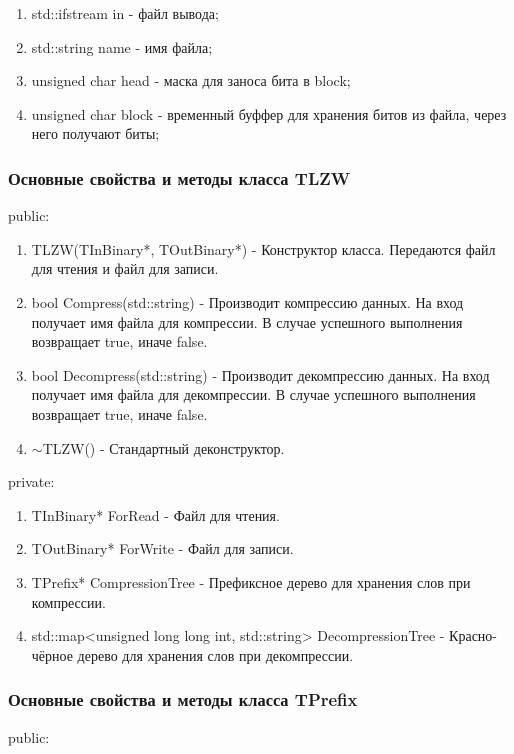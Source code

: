 \documentclass[12pt]{article}
\begin{document}
\begin{enumerate}
	\item std::ifstream in - файл вывода;
    \item std::string name - имя файла;
    \item unsigned char head - маска для заноса бита в block;
    \item unsigned char block - временный буффер для хранения битов из файла, через него получают биты;
\end{enumerate}

\subsubsection*{Основные свойства и методы класса TLZW}
\noindent
public:

\begin{enumerate}
	\item TLZW(TInBinary*, TOutBinary*) - Конструктор класса. Передаются файл для чтения и файл для записи.
	\item bool Compress(std::string) - Производит компрессию данных. На вход получает имя файла для компрессии. В случае успешного выполнения возвращает true, иначе false.
	\item bool Decompress(std::string) - Производит декомпрессию данных. На вход получает имя файла для декомпрессии. В случае успешного выполнения возвращает true, иначе false.
	\item $\sim$TLZW() - Стандартный деконструктор.
\end{enumerate}
\noindent
private:

\begin{enumerate}
	\item TInBinary* ForRead - Файл для чтения.
	\item TOutBinary* ForWrite - Файл для записи.
	\item TPrefix* CompressionTree - Префиксное дерево для хранения слов при компрессии.
	\item std::map<unsigned long long int, std::string> DecompressionTree - Красно-чёрное дерево для хранения слов при декомпрессии.
\end{enumerate}

\subsubsection*{Основные свойства и методы класса TPrefix}

\noindent
public:
\end{document}

